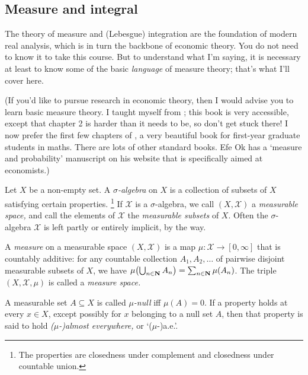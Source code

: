 \documentclass[11pt,letterpaper,reqno,oneside]{book}
\begin{document}
\begin{appendices}





\chapter{Measure and integral}
\label{ch:meas}

The theory of measure and (Lebesgue) integration are the foundation of modern real analysis, which is in turn the backbone of economic theory.
You do not need to know it to take this course.
But to understand what I'm saying,
it is necessary at least to know some of the basic \emph{language} of measure theory; that's what I'll cover here.

(If you'd like to pursue research in economic theory, then I would advise you to learn basic measure theory.
I taught myself from \textcite{Rosenthal2006}; this book is very accessible, except that chapter 2 is harder than it needs to be, so don't get stuck there! I now prefer the first few chapters of \textcite{Folland1999}, a very beautiful book for first-year graduate students in maths. There are lots of other standard books. Efe Ok has a `measure and probability' manuscript on his website that is specifically aimed at economists.)


Let $X$ be a non-empty set.
A \emph{$\sigma$-algebra} on $X$ is a collection of subsets of $X$ satisfying certain properties.%
	\footnote{The properties are closedness under complement and closedness under countable union.}
If $\mathcal{X}$ is a $\sigma$-algebra, we call $(X,\mathcal{X})$ a \emph{measurable space,} and call the elements of $\mathcal{X}$ the \emph{measurable subsets} of $X$.
Often the $\sigma$-algebra $\mathcal{X}$ is left partly or entirely implicit, by the way.

A \emph{measure} on a measurable space $(X,\mathcal{X})$ is a map $\mu : \mathcal{X} \to [0,\infty]$ that is countably additive:
for any countable collection $A_1,A_2,\dots$ of pairwise disjoint measurable subsets of $X$,
we have $\mu\left( \Union_{n \in \N} A_n \right) = \sum_{n \in \N} \mu(A_n)$.
The triple $(X,\mathcal{X},\mu)$ is called a \emph{measure space.}

A measurable set $A \subseteq X$ is called \emph{$\mu$-null} iff $\mu(A)=0$. If a property holds at every $x \in X$, except possibly for $x$ belonging to a null set $A$, then that property is said to hold \emph{($\mu$-)almost everywhere,} or `($\mu$-)a.e.'.


\end{appendices}
\end{document}
